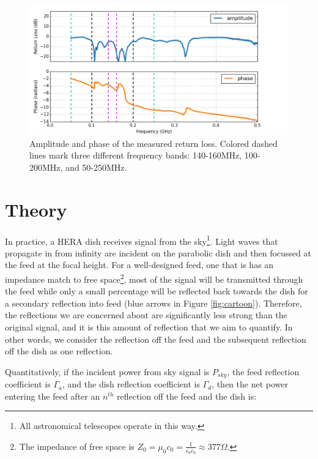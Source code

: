 \documentclass[12pt,preprint]{aastex}
\begin{document}
\begin{figure}
\centering
\includegraphics[totalheight=0.4\textheight]{plots/frequency_amp_phase_fullbw.png}
\caption{Amplitude and phase of the measured return loss. Colored dashed lines mark three different frequency bands: 140-160MHz, 100-200MHz, and 50-250MHz.}
\label{fig:freq}
\end{figure}



\section{Theory}{\label{sec:theory}}



In practice, a HERA dish receives signal from the sky\footnote{All astronomical
telescopes operate in this way.}. Light waves that propagate in from infinity are
incident on the parabolic dish and then focussed at the feed at the focal
height. For a well-designed feed, one that is has an impedance match to
free space\footnote{The impedance of free space is $Z_{0} = \mu_{0}c_{0} =
\frac{1}{\epsilon_{0}c_{0}} \approx 377\Omega $.}, most of the signal will be
transmitted through the feed while only a small percentage will be reflected
back towards the dish for a secondary reflection into feed (blue arrows in
Figure \ref{fig:cartoon}).  Therefore, the reflections we are concerned about
are significantly less strong than the original signal, and it is this amount of
reflection that we aim to quantify.  In other words, we consider the reflection
off the feed and the subsequent reflection off the dish as one reflection.

Quantitatively, if the incident power from sky signal is $P_{sky}$, the feed
reflection coefficient is $\Gamma_{a}$, and the dish reflection
coefficient is $\Gamma_{d}$, then the net power entering the feed after an
$n^{th}$ reflection off the feed and the dish is:
\end{document}
